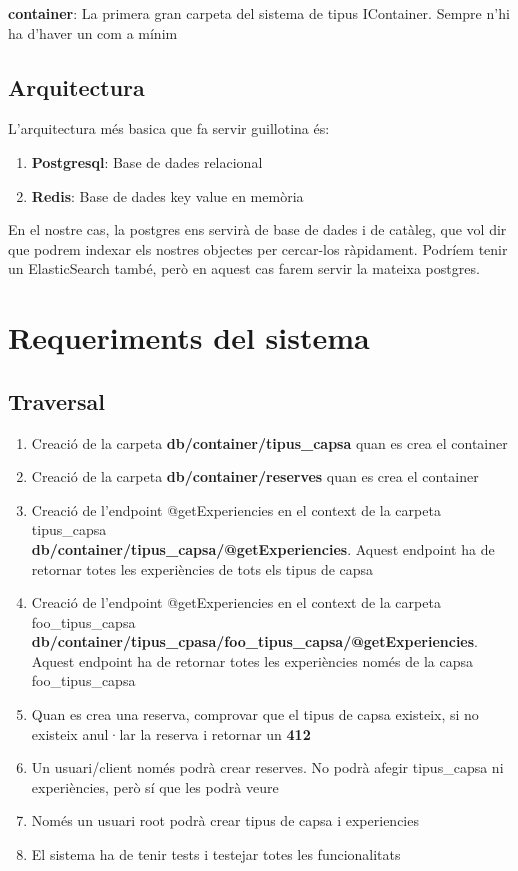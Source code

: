 \documentclass[a4paper, 11pt]{article}
\begin{document}
\textbf{container}: La primera gran carpeta del sistema de tipus
IContainer. Sempre n'hi ha d'haver un com a mínim
\subsection{Arquitectura}
L'arquitectura més basica que fa servir guillotina és:
\begin{enumerate}
\item \textbf{Postgresql}: Base de dades relacional
\item \textbf{Redis}: Base de dades key value en memòria
\end{enumerate}
En el nostre cas, la postgres ens servirà de base de dades i de
catàleg, que vol dir que podrem indexar els nostres objectes per
cercar-los ràpidament. Podríem tenir un ElasticSearch també, però en
aquest cas farem servir la mateixa postgres.


\section{Requeriments del sistema}
\subsection{Traversal}
\begin{enumerate}
\item Creació de la carpeta \textbf{db/container/tipus\_capsa} quan es crea el container
\item Creació de la carpeta \textbf{db/container/reserves} quan es crea el container
\item Creació de l'endpoint {@}getExperiencies en el context de la
  carpeta tipus\_capsa \\ \textbf{db/container/tipus\_capsa/{@}getExperiencies}. Aquest
  endpoint ha de retornar totes les experiències de tots els tipus
  de capsa
\item Creació de l'endpoint {@}getExperiencies en el context de la
  carpeta foo\_tipus\_capsa \\
  \textbf{db/container/tipus\_cpasa/foo\_tipus\_capsa/{@}getExperiencies}. Aquest
  endpoint ha de retornar totes les experiències només de la capsa
  foo\_tipus\_capsa
\item Quan es crea una reserva, comprovar que el tipus de capsa
  existeix, si no existeix anul·lar la reserva i retornar un \textbf{412}
\item Un usuari/client només podrà crear reserves. No podrà afegir
  tipus\_capsa ni experiències, però sí que les podrà veure
\item Només un usuari root podrà crear tipus de capsa i experiencies
\item El sistema ha de tenir tests i testejar totes les funcionalitats
\end{enumerate}
\end{document}

